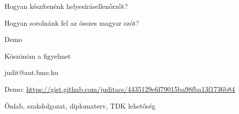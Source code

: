 \documentclass[xcolor=rgb]{beamer}
\begin{document}
\begin{frame}{}

    \Large Hogyan készítenénk helyesírásellenőrzőt?

    \pause

    \vspace*{1cm}

    Hogyan sorolnánk fel az összes magyar szót?

    \pause

    \vspace*{1cm}

    Demo
\end{frame}

\begin{frame}{Köszönöm a figyelmet}
    \begin{center}
        judit@aut.bme.hu

        \vspace*{2cm}

            Demo: \url{https://gist.github.com/juditacs/4435129e6f79015ba98fba13f1736b84}

        \vspace*{2cm}
        Önlab, szakdolgozat, diplomaterv, TDK lehetőség
    \end{center}
\end{frame}
\end{document}
